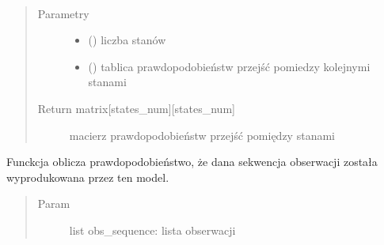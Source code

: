\documentclass[letterpaper,10pt,polish]{sphinxmanual}
\begin{document}
\begin{fulllineitems}

\begin{fulllineitems}
\label{\detokenize{HMM:HMM.HMM.create_transition_ppb}}~\begin{quote}\begin{description}
\item[{Parametry}] \leavevmode\begin{itemize}
\item {} 
 () \textendash{} liczba stanów

\item {} 
 (\sphinxstyleliteralemphasis{{[}}\sphinxstyleliteralemphasis{{]}}\sphinxstyleliteralemphasis{{[}}\sphinxstyleliteralemphasis{{]}}) \textendash{} tablica prawdopodobieństw przejść pomiedzy kolejnymi stanami

\end{itemize}

\item[{Return matrix{[}states\_num{]}{[}states\_num{]}}] \leavevmode
macierz prawdopodobieństw przejść pomiędzy stanami

\end{description}\end{quote}

\end{fulllineitems}


\begin{fulllineitems}
\label{\detokenize{HMM:HMM.HMM.evaluate}}
Funckcja oblicza prawdopodobieństwo, że dana sekwencja obserwacji została wyprodukowana przez ten model.
\begin{quote}\begin{description}
\item[{Param}] \leavevmode
list obs\_sequence: lista obserwacji

\end{description}\end{quote}

\end{fulllineitems}


\end{fulllineitems}
\end{document}
